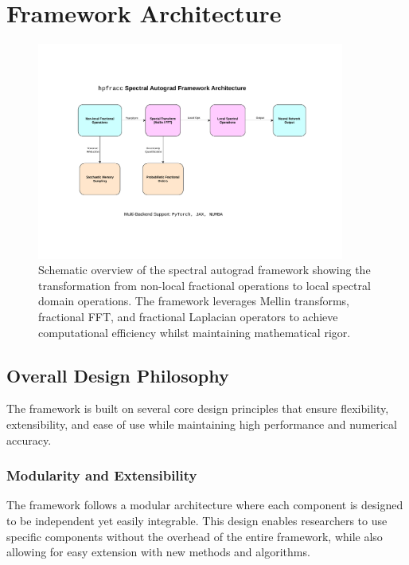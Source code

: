 \section{Framework Architecture}

\begin{figure}[h]
\centering
\includegraphics[width=0.9\textwidth]{../figures/architecture_overview.pdf}
\caption{Schematic overview of the \hpfracc spectral autograd framework showing the transformation from non-local fractional operations to local spectral domain operations. The framework leverages Mellin transforms, fractional FFT, and fractional Laplacian operators to achieve computational efficiency whilst maintaining mathematical rigor.}
\label{fig:architecture_overview}
\end{figure}

\subsection{Overall Design Philosophy}

The \hpfracc framework is built on several core design principles that ensure flexibility, extensibility, and ease of use while maintaining high performance and numerical accuracy.

\subsubsection{Modularity and Extensibility}

The framework follows a modular architecture where each component is designed to be independent yet easily integrable. This design enables researchers to use specific components without the overhead of the entire framework, while also allowing for easy extension with new methods and algorithms.

